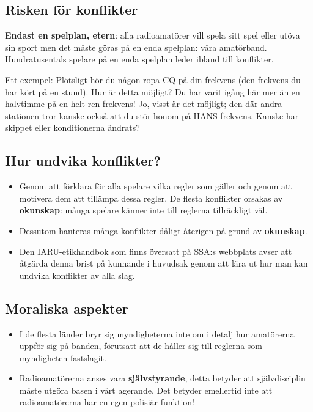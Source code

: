 \subsection{Risken för konflikter}
\textbf{Endast en spelplan, etern}: alla radioamatörer vill spela sitt spel
eller utöva sin sport men det måste göras på en enda spelplan: våra amatörband.
Hundratusentals spelare på en enda spelplan leder ibland till konflikter.

Ett exempel: Plötsligt hör du någon ropa CQ på din frekvens (den frekvens du
har kört på en stund).
Hur är detta möjligt?
Du har varit igång här mer än en halvtimme på en helt ren frekvens!
Jo, visst är det möjligt; den där andra stationen tror kanske också att du stör
honom på HANS frekvens.
Kanske har skippet eller konditionerna ändrats?

\subsection{Hur undvika konflikter?}
\begin{itemize}
\item Genom att förklara för alla spelare vilka regler som gäller och genom
  att motivera dem att tillämpa dessa regler.
  De flesta konflikter orsakas av \textbf{okunskap}:
  många spelare känner inte till reglerna tillräckligt väl.

\item Dessutom hanteras många konflikter dåligt återigen på grund av
  \textbf{okunskap}.

\item Den IARU-etikhandbok som finns översatt på SSA:s webbplats avser att
  åtgärda denna brist på kunnande i huvudsak genom att lära ut hur man kan
  undvika konflikter av alla slag.
\end{itemize}

\subsection{Moraliska aspekter}
\begin{itemize}
\item I de flesta länder bryr sig myndigheterna inte om i detalj hur
  amatörerna uppför sig på banden, förutsatt att de håller sig till reglerna
  som myndigheten fastslagit.
\item Radioamatörerna anses vara \textbf{självstyrande}, detta betyder att
  självdisciplin måste utgöra basen i vårt agerande. Det betyder emellertid
  inte att radioamatörerna har en egen polisiär funktion!
\end{itemize}

